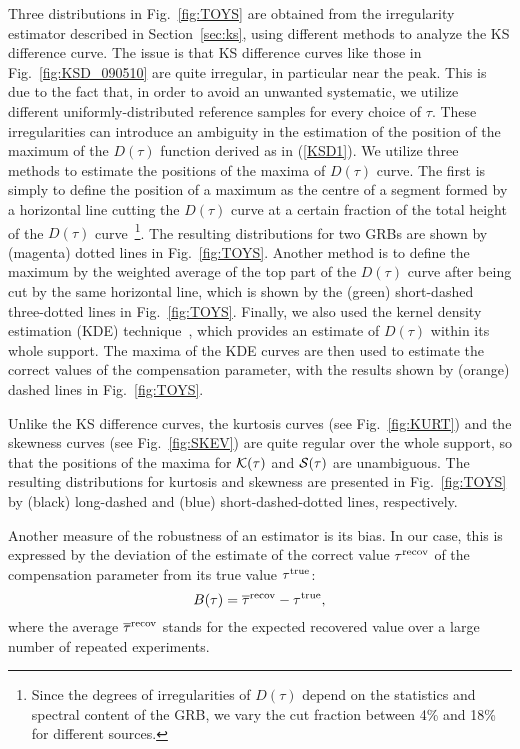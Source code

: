 \documentclass[12pt]{article}
\newcommand{\beq}{\begin{equation}}
\newcommand{\eeq}{\end{equation}}
\begin{document}
{Three distributions in Fig.~\ref{fig:TOYS} are obtained from the irregularity estimator described in Section~\ref{sec:ks},
using different methods to analyze the KS difference curve. The issue is that KS difference curves like those in Fig.~\ref{fig:KSD_090510}
are quite irregular, in particular near the peak. This is due to the fact that, in order to avoid an unwanted systematic, we utilize
different uniformly-distributed reference samples for every choice of $\tau $. These irregularities
can introduce an ambiguity in the estimation of the position of the maximum of the $D(\tau )$ function derived as in (\ref{KSD1}).
We utilize three methods to estimate the positions of the maxima of $D(\tau )$ curve.
The first is simply to define the position of a maximum
as the centre of a segment formed by a horizontal line cutting the $D(\tau )$ curve at a
certain fraction of the total height of the $D(\tau )$ curve~\footnote{Since the degrees of irregularities of $D(\tau )$ depend on the
statistics and spectral content of the GRB, we vary the cut fraction between 4\% and 18\% for different
sources.}. The resulting distributions for two GRBs are shown by (magenta) dotted lines in Fig.~\ref{fig:TOYS}.
Another method is to define the maximum by the weighted average of the
top part of the $D(\tau )$ curve after being cut by the same horizontal line, which is shown by the (green) short-dashed
three-dotted lines in Fig.~\ref{fig:TOYS}. Finally, we also used the kernel density estimation (KDE) technique~\cite{tkde}, which
provides an estimate of $D(\tau )$ within its whole support. The
maxima of the KDE curves are then used to estimate the correct values of the compensation parameter, with
the results shown by (orange) dashed lines in Fig.~\ref{fig:TOYS}.

Unlike the KS difference curves, the kurtosis curves (see Fig.~\ref{fig:KURT}) and the skewness curves (see Fig.~\ref{fig:SKEV}) are quite regular over
the whole support, so that the positions of the maxima for ${\cal K(\tau )}$ and ${\cal S(\tau )}$
are unambiguous. The resulting distributions for kurtosis and skewness are presented in Fig.~\ref{fig:TOYS} by (black) long-dashed and (blue)
short-dashed-dotted lines, respectively.

Another measure of the robustness of an estimator is its bias. In our case, this is
expressed by the deviation of the estimate of the correct value $\tau ^{\rm recov}$
of the compensation parameter from its true value $\tau ^{\rm true}$:
\beq
\label{bias}
B(\tau ) = \overline\tau ^{\rm recov} -\tau ^{\rm true},
\eeq
where the average $\overline\tau ^{\rm recov}$ stands for the expected recovered value over a large number
of repeated experiments.

}
\end{document}
